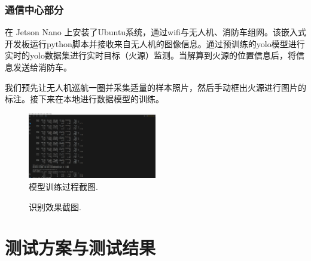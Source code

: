 \documentclass[12pt, a4paper, oneside]{article}
\begin{document}
\subsubsection{通信中心部分}


在 Jetson Nano 上安装了Ubuntu系统，通过wifi与无人机、消防车组网。该嵌入式开发板运行python脚本并接收来自无人机的图像信息。通过预训练的yolo模型进行实时的yolo数据集进行实时目标（火源）监测。当解算到火源的位置信息后，将信息发送给消防车。


我们预先让无人机巡航一圈并采集适量的样本照片，然后手动框出火源进行图片的标注。接下来在本地进行数据模型的训练。

\begin{figure}[H]
    \centering
    \includegraphics[width=0.5\textwidth]{image-8.png}
    \caption{模型训练过程截图.}
    \label{模型训练过程截图}
\end{figure}

\begin{figure}[H]
    \centering
    \caption{识别效果截图.}
\end{figure}

\section{测试方案与测试结果}
\end{document}
